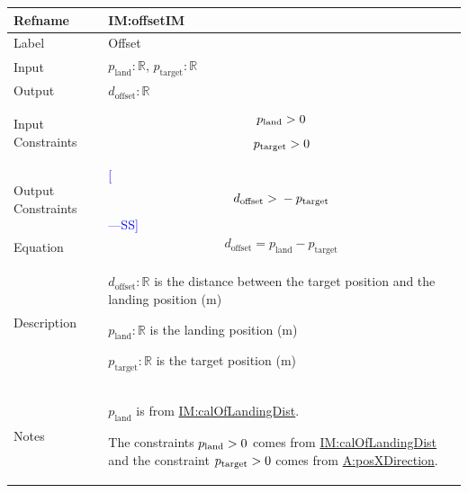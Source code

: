 \documentclass[12pt]{article}
\newcommand{\authornote}[3]{\textcolor{#1}{[#3 ---#2]}}
\newcommand{\authornote}[3]{}
\newcommand{\wss}[1]{\authornote{blue}{SS}{#1}}
\newcommand{\gt}{\ensuremath >}
\begin{document}
\medskip
\noindent
\begin{minipage}{\textwidth}
\begin{tabular}{>{\raggedright}p{}>{\raggedright\arraybackslash}p{}}
\toprule \textbf{Refname} & \textbf{IM:offsetIM}
\label{IM:offsetIM}
\\ \midrule
Label & Offset
        
\\ \midrule
Input & ${p_{\text{land}}}: \mathbb{R}$, ${p_{\text{target}}}: \mathbb{R}$
        
\\ \midrule
Output & ${d_{\text{offset}}}: \mathbb{R}$
         
\\ \midrule
Input Constraints & \begin{displaymath}
                    {p_{\text{land}}}\gt{}0
                    \end{displaymath}
                    \begin{displaymath}
                    {p_{\text{target}}}\gt{}0
                    \end{displaymath}
\\ \midrule
Output Constraints & \wss{\begin{displaymath}
        {d_{\text{offset}}}\gt{}-{p_{\text{target}}}
        \end{displaymath}}
\\ \midrule
Equation & \begin{displaymath}
           {d_{\text{offset}}}={p_{\text{land}}}-{p_{\text{target}}}
           \end{displaymath}
\\ \midrule
Description & \begin{symbDescription}
              \item{${d_{\text{offset}}}: \mathbb{R}$ is the distance between the target position and the landing position (${\text{m}}$)}
              \item{${p_{\text{land}}}: \mathbb{R}$ is the landing position (${\text{m}}$)}
              \item{${p_{\text{target}}}: \mathbb{R}$ is the target position (${\text{m}}$)}
              \end{symbDescription}
\\ \midrule
Notes & ${p_{\text{land}}}$ is from \hyperref[IM:calOfLandingDist]{IM:calOfLandingDist}.
        
        The constraints ${p_{\text{land}}}\gt{}0$ comes from \hyperref[IM:calOfLandingDist]{IM:calOfLandingDist} and the constraint ${p_{\text{target}}}\gt{}0$ comes from \hyperref[posXDirection]{A:posXDirection}. 


\end{tabular}
\end{minipage}
\end{document}
